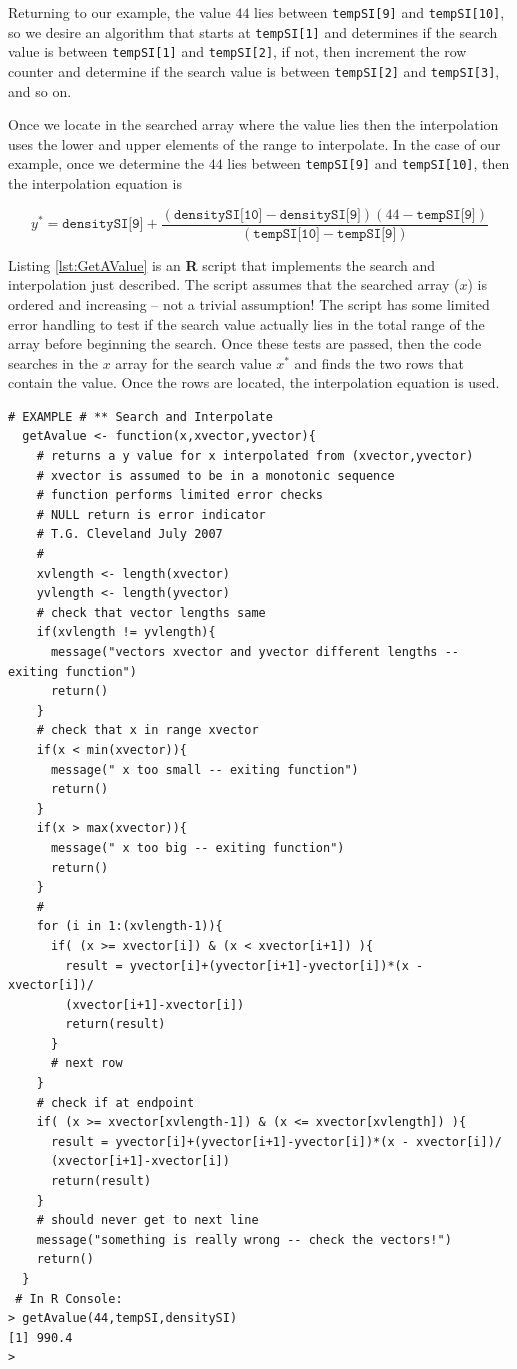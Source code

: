 Returning to our example, the value $44$ lies between \texttt{tempSI[9]} and \texttt{tempSI[10]}, so we desire an algorithm that starts at \texttt{tempSI[1]} and determines if the search value is between \texttt{tempSI[1]} and \texttt{tempSI[2]}, if not, then increment the row counter and determine if the search value is between \texttt{tempSI[2]} and \texttt{tempSI[3]}, and so on.

Once we locate in the searched array where the value lies then the interpolation uses the lower and upper elements of the range to interpolate.  In the case of our example, once we determine the $44$ lies between  \texttt{tempSI[9]} and \texttt{tempSI[10]}, then the interpolation equation is

\begin{equation}
y^*=\texttt{densitySI[9]}+\frac{(\texttt{densitySI[10]}-\texttt{densitySI[9]})(44-\texttt{tempSI[9]})}{(\texttt{tempSI[10]}-\texttt{tempSI[9]})}
\label{eqn:InterpolationArrayEquation}
\end{equation}

Listing \ref{lst:GetAValue} is an \textbf{R} script that implements the search and interpolation just described.  The script assumes that the searched array ($x$) is ordered and increasing -- not a trivial assumption!  The script has some limited error handling to test if the search value actually lies in the total range of the array before beginning the search.  Once these tests are passed, then the code searches in the $x$ array for the search value $x^*$ and finds the two rows that contain the value.  Once the rows are located, the interpolation equation is used.

\begin{lstlisting}[caption=R code to Search and Interpolate, label=lst:GetAValue]
# EXAMPLE # ** Search and Interpolate
  getAvalue <- function(x,xvector,yvector){
    # returns a y value for x interpolated from (xvector,yvector)
    # xvector is assumed to be in a monotonic sequence
    # function performs limited error checks
    # NULL return is error indicator
    # T.G. Cleveland July 2007 
    #
    xvlength <- length(xvector)
    yvlength <- length(yvector)
    # check that vector lengths same
    if(xvlength != yvlength){
      message("vectors xvector and yvector different lengths -- exiting function")
      return()
    }
    # check that x in range xvector
    if(x < min(xvector)){
      message(" x too small -- exiting function")
      return()
    }
    if(x > max(xvector)){
      message(" x too big -- exiting function")
      return()
    }
    #
    for (i in 1:(xvlength-1)){
      if( (x >= xvector[i]) & (x < xvector[i+1]) ){
        result = yvector[i]+(yvector[i+1]-yvector[i])*(x - xvector[i])/
        (xvector[i+1]-xvector[i])
        return(result)
      }
      # next row  
    }
    # check if at endpoint
    if( (x >= xvector[xvlength-1]) & (x <= xvector[xvlength]) ){
      result = yvector[i]+(yvector[i+1]-yvector[i])*(x - xvector[i])/
      (xvector[i+1]-xvector[i])
      return(result)
    }
    # should never get to next line
    message("something is really wrong -- check the vectors!")
    return()
  }
 # In R Console:  
> getAvalue(44,tempSI,densitySI)
[1] 990.4
> 
  \end{lstlisting}  

